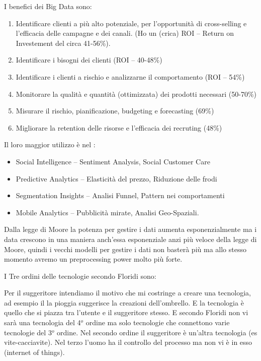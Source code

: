 \documentclass[]{article}
\begin{document}
I benefici dei Big Data sono:

\begin{enumerate}
	\def\labelenumi{\arabic{enumi}.}
	 
	\item
	Identificare clienti a più alto potenziale, per l'opportunità di
	cross-selling e l'efficacia delle campagne e dei canali. (Ho un
	(crica) ROI -- Return on Investement del circa 41-56\%).
	\item
	Identificare i bisogni dei clienti (ROI -- 40-48\%)
	\item
	Identificare i clienti a rischio e analizzarne il comportamento (ROI
	-- 54\%)
	\item
	Monitorare la qualità e quantità (ottimizzata) dei prodotti necessari
	(50-70\%)
	\item
	Misurare il rischio, pianificazione, budgeting e forecasting (69\%)
	\item
	Migliorare la retention delle risorse e l'efficacia dei recruting
	(48\%)
\end{enumerate}

Il loro maggior utilizzo è nel :

\begin{itemize}
	 
	\item
	Social Intelligence -- Sentiment Analysis, Social Customer Care
	\item
	Predictive Analytics -- Elasticità del prezzo, Riduzione delle frodi
	\item
	Segmentation Insights -- Analisi Funnel, Pattern nei comportamenti
	\item
	Mobile Analytics -- Pubblicità mirate, Analisi Geo-Spaziali.
\end{itemize}

Dalla legge di Moore la potenza per gestire i dati aumenta
esponenzialmente ma i data crescono in una maniera anch'essa
esponenziale anzi più veloce della legge di Moore, quindi i vecchi
modelli per gestire i dati non basterà più ma allo stesso momento avremo
un preprocessing power molto più forte.

I Tre ordini delle tecnologie secondo Floridi sono:

Per il suggeritore intendiamo il motivo che mi costringe a creare una
tecnologia, ad esempio il la pioggia suggerisce la creazioni
dell'ombrello. E la tecnologia è quello che si piazza tra l'utente e il
suggeritore stesso. E secondo Floridi non vi sarà una tecnologia del 4$^o$
ordine ma solo tecnologie che connettono varie tecnologie del 3$^o$ ordine.
Nel secondo ordine il suggeritore è un'altra tecnologia (es vite-cacciavite).
Nel terzo l'uomo ha il controllo del processo ma non vi è in esso (internet
of things).
\end{document}
